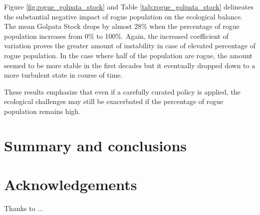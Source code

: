 \documentclass[final,5p,times,twocolumn,authoryear]{elsarticle}
\begin{document}
Figure \ref{fig:rogue_golpata_stock} and Table \ref{tab:rogue_golpata_stock} delineates the substantial negative impact of rogue population on the ecological balance. The mean Golpata Stock drops by almost 28\% when the percentage of rogue population increases from 0\% to 100\%. Again, the increased coefficient of variation proves the greater amount of instability in case of elevated percentage of rogue population. In the case where half of the population are rogue, the amount seemed to be more stable in the first decades but it eventually dropped down to a more turbulent state in course of time. 

These results emphasize that even if a carefully curated policy is applied, the ecological challenges may still be exacerbated if the percentage of rogue population remains high.




\section{Summary and conclusions}



\section*{Acknowledgements}
Thanks to ...




\printbibliography
\end{document}
